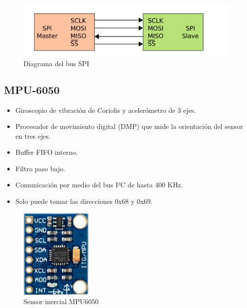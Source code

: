 \documentclass[12pt]{report}
\begin{document}
\begin{figure}[htb]
	\centering
	\includegraphics[scale=0.5]{spi.png}
	\caption{Diagrama del bus SPI}
\end{figure}

\subsection*{MPU-6050}
\begin{itemize}
	
	\item Giroscopio de vibración de Coriolis y acelerómetro de 3 ejes.
	
	\item Procesador de movimiento digital (DMP) que mide la orientación del sensor en tres ejes.
	
	\item Buffer FIFO interno.
	
	\item Filtro paso bajo.
	
	\item Comunicación por medio del bus I²C de hasta 400 KHz.
	
	\item Solo puede tomar las direcciones 0x68 y 0x69.
	
\end{itemize}

\begin{figure}[htb]
	\centering
	\includegraphics[scale=0.5]{mpu6050.jpg}
	\caption{Sensor inercial MPU6050}
\end{figure}
\end{document}
